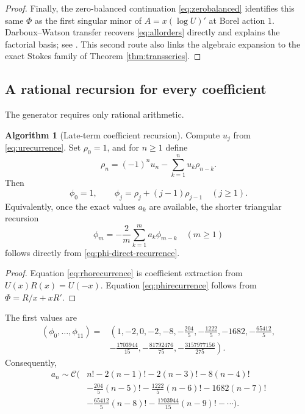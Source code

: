 \documentclass[11pt,a4paper]{article}
\theoremstyle{definition}
\newtheorem{algorithm}[theorem]{Algorithm}
\theoremstyle{remark}
\newcommand{\constC}{\mathcal{C}}
\begin{document}
\begin{proof}
Finally, the zero-balanced continuation \eqref{eq:zerobalanced} identifies this same \(\Phi\) as the first singular minor of \(A=x(\log U)'\) at Borel action \(1\).  Darboux--Watson transfer recovers \eqref{eq:allorders} directly and explains the factorial basis; see \cite{Balser,Costin}.  This second route also links the algebraic expansion to the exact Stokes family of Theorem \ref{thm:transseries}.
\end{proof}

\subsection{A rational recursion for every coefficient}

The generator requires only rational arithmetic.

\begin{algorithm}[Late-term coefficient recursion]\label{alg:phi}
Compute \(u_j\) from \eqref{eq:urecurrence}.  Set \(\rho_0=1\), and for \(n\ge1\) define
\begin{equation}\label{eq:rhorecurrence}
 \rho_n=(-1)^nu_n-\sum_{k=1}^{n}u_k\rho_{n-k}.
\end{equation}
Then
\begin{equation}\label{eq:phirecurrence}
 \phi_0=1,
 \qquad
 \phi_j=\rho_j+(j-1)\rho_{j-1}
 \quad(j\ge1).
\end{equation}
Equivalently, once the exact values \(a_k\) are available, the shorter triangular recursion
\begin{equation}\label{eq:phi-short}
 \phi_m=-\frac{2}{m}\sum_{k=1}^{m}a_k\phi_{m-k}
 \quad(m\ge1)
\end{equation}
follows directly from \eqref{eq:phi-direct-recurrence}.
\end{algorithm}

\begin{proof}
Equation \eqref{eq:rhorecurrence} is coefficient extraction from \(U(x)R(x)=U(-x)\).  Equation \eqref{eq:phirecurrence} follows from \(\Phi=R/x+xR'\).
\end{proof}

The first values are
\begin{equation}\label{eq:philist}
\begin{split}
(\phi_0,\ldots,\phi_{11})={}&\left(
1,-2,0,-2,-8,-\frac{204}{5},-\frac{1222}{5},-1682,
-\frac{65412}{5},\right.\\
&\left.-\frac{1703944}{15},-\frac{81792476}{75},
-\frac{3157977156}{275}\right).
\end{split}
\end{equation}
Consequently,
\begin{equation}\label{eq:factorialdisplay}
\begin{split}
 a_n\sim\constC\bigg(&n!-2(n-1)!-2(n-3)!-8(n-4)!\\
 &-\frac{204}{5}(n-5)!-\frac{1222}{5}(n-6)!-1682(n-7)!\\
 &-\frac{65412}{5}(n-8)!-\frac{1703944}{15}(n-9)!-\cdots\bigg).
\end{split}
\end{equation}
\end{document}
